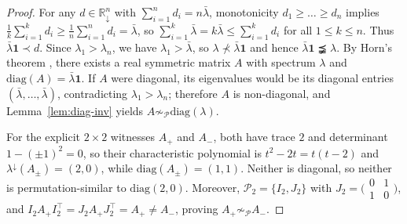 \documentclass[11pt]{article}
\theoremstyle{definition}
\theoremstyle{remark}
\newcommand{\R}{\mathbb{R}}
\newcommand{\Ptwo}{\mathcal{P}_2}
\newcommand{\diag}{\mathrm{diag}}
\newcommand{\Ones}{\mathbf{1}}
\begin{document}
\begin{proof}
For any $d \in \R_\downarrow^n$ with $\sum_{i=1}^n d_i = n\bar{\lambda}$, monotonicity
$d_1 \ge \dots \ge d_n$ implies $\frac{1}{k}\sum_{i=1}^k d_i \ge
\frac{1}{n}\sum_{i=1}^n d_i = \bar{\lambda}$, so $\sum_{i=1}^k \bar{\lambda} =
k\bar{\lambda} \le \sum_{i=1}^k d_i$ for all $1 \le k \le n$. Thus
$\bar{\lambda}\Ones \prec d$. Since $\lambda_1 > \lambda_n$, we have
$\lambda_1 > \bar{\lambda}$, so $\lambda \not\prec \bar{\lambda}\Ones$ and hence
$\bar{\lambda}\Ones \precneqq \lambda$. By Horn's theorem \cite{Horn1954}, there
exists a real symmetric matrix $A$ with spectrum $\lambda$ and
$\diag(A) = \bar{\lambda}\Ones$. If $A$ were diagonal, its eigenvalues would be
its diagonal entries $(\bar{\lambda},\dots,\bar{\lambda})$, contradicting
$\lambda_1 > \lambda_n$; therefore $A$ is non-diagonal, and Lemma~\ref{lem:diag-inv}
yields $A \not\sim_{\mathcal{P}} \diag(\lambda)$.

For the explicit $2 \times 2$ witnesses $A_+$ and $A_-$, both have trace $2$ and
determinant $1 - (\pm 1)^2 = 0$, so their characteristic polynomial is
$t^2 - 2t = t(t-2)$ and $\lambda^\downarrow(A_\pm) = (2,0)$, while
$\diag(A_\pm) = (1,1)$. Neither is diagonal, so neither is permutation-similar
to $\diag(2,0)$. Moreover, $\Ptwo = \{ I_2, J_2 \}$ with
$J_2 = \bigl(\begin{smallmatrix} 0 & 1 \\ 1 & 0 \end{smallmatrix}\bigr)$, and
$I_2 A_+ I_2^\top = J_2 A_+ J_2^\top = A_+ \neq A_-$, proving
$A_+ \not\sim_{\mathcal{P}} A_-$.
\end{proof}
\end{document}
